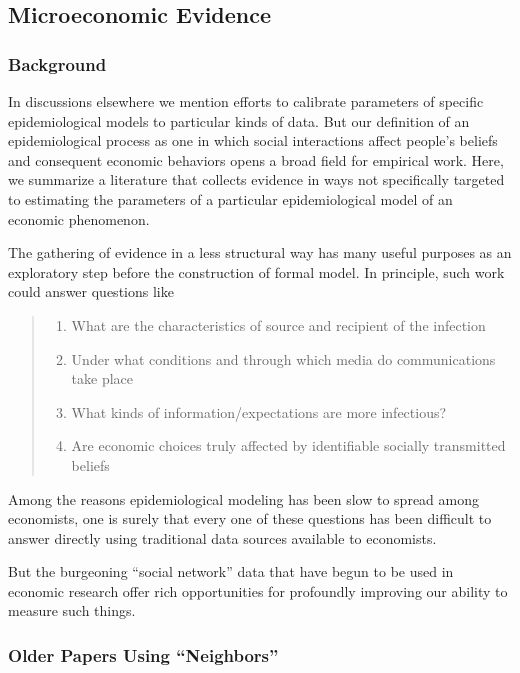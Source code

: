 \subsection{Microeconomic Evidence}\label{subsec:microEvidence}

\subsubsection{Background}
In discussions elsewhere we mention efforts to calibrate parameters of specific epidemiological models to particular kinds of data.  But our definition of an epidemiological process as one in which social interactions affect people's beliefs and consequent economic behaviors opens a broad field for empirical work.  Here, we summarize a literature that collects evidence in ways not specifically targeted to estimating the parameters of a particular epidemiological model of an economic phenomenon.

The gathering of evidence in a less structural way has many useful purposes as an exploratory step before the construction of formal model. In principle, such work could answer questions like
\begin{quote}
    \normalfont
\begin{enumerate}
    \item What are the characteristics of source and recipient of the infection
    \item Under what conditions and through which media do communications take place
    \item What kinds of information/expectations are more infectious?
    \item Are economic choices truly affected by identifiable socially transmitted beliefs
    \end{enumerate}
\end{quote}

Among the reasons epidemiological modeling has been slow to spread among economists, one is surely that every one of these questions has been difficult to answer directly using traditional data sources available to economists.

But the burgeoning ``social network'' data that have begun to be used in economic research offer rich opportunities for profoundly improving our ability to measure such things.

\subsubsection{Older Papers Using ``Neighbors''}

